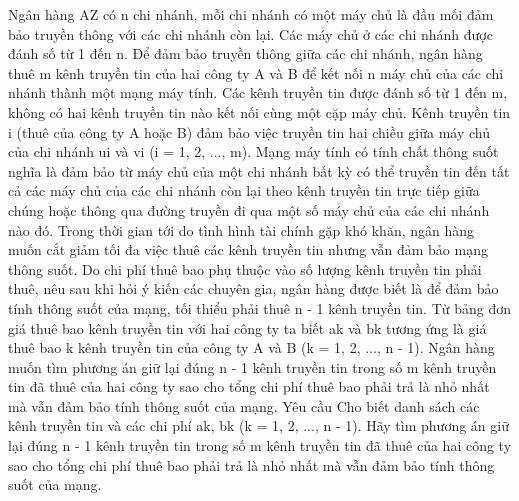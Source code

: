 Ngân hàng AZ có n chi nhánh, mỗi chi nhánh có một máy chủ là đầu mối đảm bảo truyền thông với các chi nhánh còn lại. Các máy chủ ở các chi nhánh được đánh số từ 1 đến n. Để đảm bảo truyền thông giữa các chi nhánh, ngân hàng thuê m kênh truyền tin của hai công ty A và B để kết nối n máy chủ của các chi nhánh thành một mạng máy tính. Các kênh truyền tin được đánh số từ 1 đến m, không có hai kênh truyền tin nào kết nối cùng một cặp máy chủ. Kênh truyền tin i (thuê của công ty A hoặc B) đảm bảo việc truyền tin hai chiều giữa máy chủ của chi nhánh ui và vi (i = 1, 2, ..., m). Mạng máy tính có tính chất thông suốt nghĩa là đảm bảo từ máy chủ của một chi nhánh bất kỳ có thể truyền tin đến tất cả các máy chủ của các chi nhánh còn lại theo kênh truyền tin trực tiếp giữa chúng hoặc thông qua đường truyền đi qua một số máy chủ của các chi nhánh nào đó. Trong thời gian tới do tình hình tài chính gặp khó khăn, ngân hàng muốn cắt giảm tối đa việc thuê các kênh truyền tin nhưng vẫn đảm bảo mạng thông suốt. Do chi phí thuê bao phụ thuộc vào số lượng kênh truyền tin phải thuê, nêu sau khi hỏi ý kiến các chuyên gia, ngân hàng được biết là để đảm bảo tính thông suốt của mạng, tối thiểu phải thuê n - 1 kênh truyền tin. Từ bảng đơn giá thuê bao kênh truyền tin với hai công ty ta biết ak và bk tương ứng là giá thuê bao k kênh truyền tin của công ty A và B (k = 1, 2, ..., n - 1). Ngân hàng muốn tìm phương án giữ lại đúng n - 1 kênh truyền tin trong số m kênh truyền tin đã thuê của hai công ty sao cho tổng chi phí thuê bao phải trả là nhỏ nhất mà vẫn đảm bảo tính thông suốt của mạng.
Yêu cầu
Cho biết danh sách các kênh truyền tin và các chi phí ak, bk (k = 1, 2, ..., n - 1). Hãy tìm phương án giữ lại đúng n - 1 kênh truyền tin trong số m kênh truyền tin đã thuê của hai công ty sao cho tổng chi phí thuê bao phải trả là nhỏ nhất mà vẫn đảm bảo tính thông suốt của mạng.